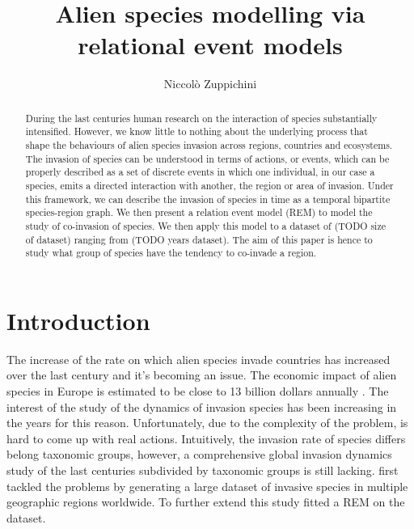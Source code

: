 \documentclass[mscthesis]{usiinfthesis}
\title{Alien species modelling via relational event models} %
\author{Niccol\`o Zuppichini} %
\begin{document}
\maketitle %

\frontmatter %

\begin{abstract}
During the last centuries human research on the interaction of species substantially intensified. However, we know little to nothing about the underlying process that shape the behaviours of alien species invasion across regions, countries and ecosystems. The invasion of species can be understood in terms of actions, or events, which can be properly described as a set of discrete events in which one individual, in our case a species, emits a directed interaction with another, the region or area of invasion. Under this framework, we can describe the invasion of species in time as a temporal bipartite species-region graph. We then present a relation event model (REM) to model the study of co-invasion of species. We then apply this model to a dataset of (TODO size of dataset) ranging from (TODO years dataset). The aim of this paper is hence to study what group of species have the tendency to co-invade a region. 



\end{abstract}



\mainmatter

\chapter{Introduction}

The increase of the rate on which alien species invade countries has increased over the last century and it's becoming an issue. The economic impact of alien species in Europe is estimated to be close to 13 billion dollars annually \citet{intro:rate}. The interest of the study of the dynamics of invasion species has been increasing in the years for this reason. Unfortunately, due to the complexity of the problem, is hard to come up with real actions. Intuitively, the invasion rate of species differs belong taxonomic groups, however, a comprehensive global invasion dynamics study of the last centuries subdivided by taxonomic groups is still lacking. \citet{intro:dataset} first tackled the problems by generating a large dataset of invasive species in multiple geographic regions worldwide. To further extend this study \citet{intro:ecological} fitted a REM on the dataset.
\end{document}
